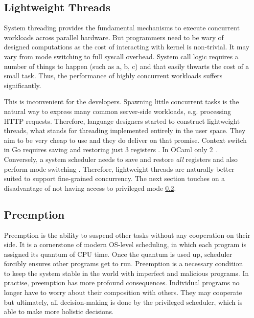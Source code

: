\documentclass[12pt,a4paper,twoside]{report}
\begin{document}
\subsection{Lightweight Threads}
\label{section:lightweight-threads}
System threading provides the fundamental mechanisms to execute concurrent workloads across parallel hardware. But programmers need to be wary of designed computations as the cost of interacting with kernel is non-trivial. It may vary from mode switching to full syscall overhead. System call logic requires a number of things to happen (such as a, b, c) and that easily thwarts the cost of a small task. Thus, the performance of highly concurrent workloads suffers significantly.

This is inconvenient for the developers. Spawning little concurrent tasks is the natural way to express many common server-side workloads, e.g. processing HTTP requests. Therefore, language designers started to construct lightweight threads, what stands for threading implemented entirely in the user space. They aim to be very cheap to use and they do deliver on that promise. Context switch in Go requires saving and restoring just 3 registers \cite{gorout_vs_os_thread}. In OCaml only 2 \cite{Sivaramakrishnan2021}. Conversely, a system scheduler needs to save and restore \textit{all} registers and also perform mode switching \cite{gorout_vs_os_thread}. Therefore, lightweight threads are naturally better suited to support fine-grained concurrency. The next section touches on a disadvantage of not having access to privileged mode \ref{section:preemption}. 


\subsection{Preemption}
\label{section:preemption}

Preemption is the ability to suspend other tasks without any cooperation on their side. It is a cornerstone of modern OS-level scheduling, in which each program is assigned its quantum of CPU time. Once the quantum is used up, scheduler forcibly ensures other programs get to run. Preemption is a necessary condition to keep the system stable in the world with imperfect and malicious programs. In practise, preemption has more profound consequences. Individual programs no longer have to worry about their composition with others. They may cooperate but ultimately, all decision-making is done by the privileged scheduler, which is able to make more holistic decisions. 
\end{document}
